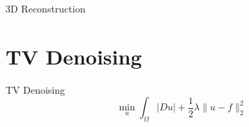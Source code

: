\documentclass{beamer}
\begin{document}
\begin{frame}{3D Reconstruction}
    \begin{figure}[H]
        \begin{floatrow}
        \end{floatrow}
    \end{figure}
\end{frame}

\section{TV Denoising}

\begin{frame}{TV Denoising}
    \begin{equation}
        \min_{u}\int_{\Omega}|Du|+\frac12\lambda \|u-f\|_2^2 \nonumber
    \end{equation}
\end{frame}
\end{document}
